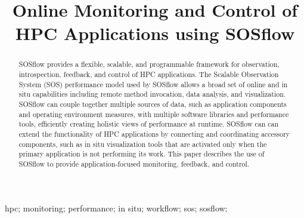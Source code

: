 
\title{Online Monitoring and Control of HPC Applications using SOSflow}

\author{
}

\maketitle



\begin{abstract} %
SOSflow provides a flexible, scalable, and programmable framework for
observation, introspection, feedback, and control of HPC
applications.
%
The Scalable Observation System (SOS) performance model used by SOSflow
allows a broad set of online and in situ capabilities including remote
method invocation, data analysis, and visualization.
%
SOSflow can couple together multiple sources of data, such as application
components and operating environment measures, with multiple software
libraries and performance tools, efficiently creating holistic views of
performance at runtime.
%
SOSflow can can extend the functionality of HPC applications by connecting
and coordinating accessory components, such as in situ visualization tools
that are activated only when the primary application is not performing its
work.
%
This paper describes the use of SOSflow to provide application-focused
monitoring, feedback, and control.
%
%

\end{abstract}


\begin{IEEEkeywords} %
hpc;
monitoring;
performance;
in situ;
workflow;
sos;
sosflow;
\end{IEEEkeywords}


\IEEEpeerreviewmaketitle


